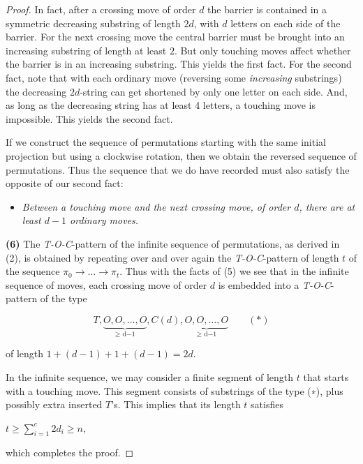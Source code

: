 \documentclass[a4paper]{article}
\begin{document}
\begin{proof}
\noindent
In fact, after a crossing move of order $d$ the barrier is contained in a symmetric decreasing substring of length $2d$, with $d$ letters on each side of the barrier. For the next crossing move the central barrier must be brought into an increasing substring of length at least $2$. But only touching moves affect whether the barrier is in an increasing substring. This yields the first fact. For the second fact, note that with each ordinary move (reversing some \textit{increasing} substrings) the decreasing $2d$-string can get shortened by only one letter on each side. And, as long as the decreasing string has at least 4 letters, a touching move is impossible. This yields the second fact.

\noindent
If we construct the sequence of permutations starting with the same initial projection but using a clockwise rotation, then we obtain the reversed sequence of permutations. Thus the sequence that we do have recorded must also satisfy the opposite of our second fact:

\begin{itemize}
\item[ ]\textit{Between a touching move and the next crossing move, of order $d$, there are at least $d − 1$ ordinary moves.}
\end{itemize}

\noindent
\textbf{(6)} The \textit{T-O-C}-pattern of the infinite sequence of permutations, as derived in (2), is obtained by repeating over and over again the \textit{T-O-C}-pattern of length $t$ of the sequence $\pi_0 \rightarrow \ldots \rightarrow \pi_t$. Thus with the facts of (5) we see that in the infinite sequence of moves, each crossing move of order $d$ is embedded into a \textit{T-O-C}-pattern of the type


$$
T,\underbrace{O, O, \ldots, O}_{\text{$\geq$ d−1}}  ,C(d),\underbrace{O, O, \ldots, O}_{\text{$\geq$ d−1}} \qquad (\ast)
$$


\noindent
of length $1+(d - 1) + 1 + (d - 1) = 2d$.
 
\noindent
In the infinite sequence, we may consider a finite segment of length $t$ that starts with a touching move. This segment consists of substrings of the type (∗), plus possibly extra inserted $T’$s. This implies that its length $t$ satisfies

\begin{center}
$ t \geq \sum_{i=1}^{c} 2d_i \geq n,$
\end{center}

\noindent
which completes the proof.

\end{proof}



\end{document}
